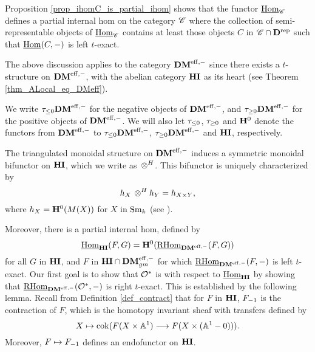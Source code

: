 Proposition \ref{prop_ihomC_is_partial_ihom} shows that the functor
$\underline{\mathrm{Hom}}_{\mathscr{C}}$ defines a partial internal hom on the category
$\mathscr{C}$ where the collection of semi-representable objects of
$\underline{\mathrm{Hom}}_{\mathscr{C}}$ contains at least those objects $C$ in $\mathscr{C} \cap
\mathbf{D}^{\mathrm{rep}}$ such that $\underline{\mathrm{Hom}}(C, -)$ is left $t$-exact.

The above discussion applies to the category $\mathbf{DM}^{\mathrm{eff},-}$ since
there exists a $t$-structure on $\mathbf{DM}^{\mathrm{eff},-}$, with the abelian 
category $\mathbf{HI}$ as its heart (see Theorem 
\ref{thm_ALocal_eq_DMeff}). 

\begin{defn}\label{def_t_struct_DMeff}
We write $\tau_{\leq 0}\mathbf{DM}^{\mathrm{eff},-}$ for the negative objects of $\mathbf{DM}^{\mathrm{eff},-}$, and 
$\tau_{\geq 0}\mathbf{DM}^{\mathrm{eff},-}$ for the positive objects of $\mathbf{DM}^{\mathrm{eff},-}$. We will 
also let $\tau_{\leq 0}$, $\tau_{\geq 0}$ and $\mathbf{H}^0$ denote the 
functors from $\mathbf{DM}^{\mathrm{eff},-}$ to $\tau_{\leq 0}\mathbf{DM}^{\mathrm{eff},-}$, $\tau_{\geq 0}\mathbf{DM}^{\mathrm{eff},-}$ 
and $\mathbf{HI}$, respectively. 
\end{defn}

The triangulated monoidal structure on $\mathbf{DM}^{\mathrm{eff},-}$ induces a 
symmetric monoidal bifunctor on $\mathbf{HI}$, which we write as $\,\otimes^H$. 
This bifunctor is uniquely characterized by
\[
h_{X} \,\otimes^H h_{Y} = h_{X \times Y},
\]
where $h_{X} = \mathbf{H}^0(M(X))$ for $X$ in $\mathrm{Sm}_{k}$ (see 
\cite[1.8]{DegModHom}).

Moreover, there is a partial internal hom, defined by
\[
\underline{\mathrm{Hom}}_{\mathbf{HI}}(F, G) = \mathbf{H}^0(\underline{\mathrm{RHom}}_{\mathbf{DM}^{\mathrm{eff},-}}(F, G))
\]
for all $G$ in $\mathbf{HI}$, and $F$ in $\mathbf{HI} \cap \mathbf{DM}^{\mathrm{eff},-}_{gm}$ for which 
$\underline{\mathrm{RHom}}_{\mathbf{DM}^{\mathrm{eff},-}}(F, -)$ is left $t$-exact. Our first goal is to show that 
$\mathcal{O}^*$ is \SemiInvertible with respect to $\underline{\mathrm{Hom}}_{\mathbf{HI}}$ by showing that
$\underline{\mathrm{RHom}}_{\mathbf{DM}^{\mathrm{eff},-}}(\mathcal{O}^*, -)$ is right $t$-exact. This is established by the 
following lemma. Recall from Definition \ref{def_contract} that 
for $F$ in $\mathbf{HI}$, $F_{-1}$ is the contraction of $F$, which is 
the homotopy invariant sheaf with transfers defined by
\[
X \mapsto \mathrm{cok}(F(X \times \mathbb{A}^1) \longrightarrow F(X \times 
(\mathbb{A}^1 - 0)) ).
\]
Moreover, $F \mapsto F_{-1}$ defines an endofunctor on $\mathbf{HI}$. 

